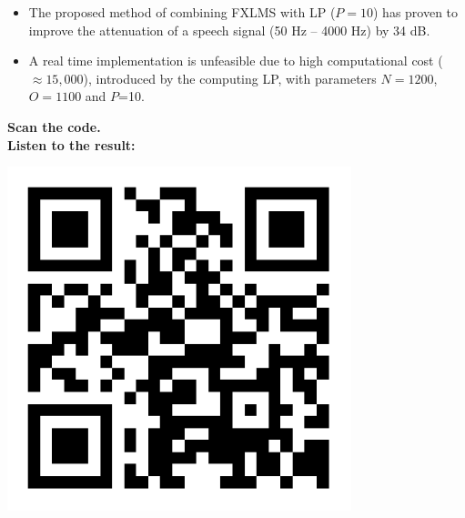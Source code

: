 \large
\begin{itemize}
	\item The proposed method of combining FXLMS with LP ($P=10$) has proven to improve the attenuation of a speech signal (50 Hz -- 4000 Hz) by 34 dB. \\
	\item A real time implementation is unfeasible due to high computational cost ($\approx15,000$), introduced by the computing LP, with parameters $N=1200$, $O=1100$ and $P$=10. \\
\end{itemize}
 \begin{minipage}{.8\columnwidth}
 	\begin{center}
	 	\textbf{Scan the code.}\\
	 	\textbf{Listen to the result:}
 	\end{center}
 \end{minipage}%
 \begin{minipage}{0.2\columnwidth}
 	\includegraphics[width=0.75\textwidth]{figures/QRCODE.pdf}
 \end{minipage}